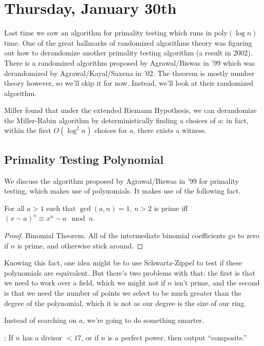 \documentclass[11 pt]{scrartcl}
\begin{document}
\newpage
\section{Thursday, January 30th}

Last time we saw an algorithm for primality testing which runs in $\text{poly}(\log n)$ time. One of the great hallmarks of randomized algorithms theory was figuring out how to derandomize another primality testing algorithm (a result in 2002). There is a randomized algorithm proposed by Agrawal/Biswas in '99 which was derandomized by Agrawal/Kayal/Saxena in '02. The theorem is mostly number theory however, so we'll skip it for now. Instead, we'll look at their randomized algorithm. 

Miller found that under the extended Riemann Hypothesis, we can derandomize the Miller-Rabin algorithm by deterministically finding a choices of $a$: in fact, within the first $O(\log ^2 n)$ choices for $a$, there exists a witness. 

\subsection{Primality Testing Polynomial}

We discuss the algorithm proposed by Agrawal/Biswas in '99 for primality testing, which makes use of polynomials. It makes use of the following fact.

\begin{fact}
    For all $a > 1$ such that $\gcd(a,n) = 1$, $n > 2$ is prime iff $(x-a)^n \equiv x^n - a \mod n$. 
\end{fact}
\begin{proof}
    Binomial Theorem. All of the intermediate binomial coefficients go to zero if $n$ is prime, and otherwise stick around. 
\end{proof}

Knowing this fact, one idea might be to use Schwartz-Zippel to test if these polynomials are equivalent. But there's two problems with that: the first is that we need to work over a field, which we might not if $n$ isn't prime, and the second is that we need the number of points we select to be much greater than the degree of the polynomial, which it is not as our degree is the size of our ring. 

Instead of searching on $a$, we're going to do something smarter. 

: If $n$ has a divisor $< 17$, or if $n$ is a perfect power, then output ``composite.'' 
\end{document}
